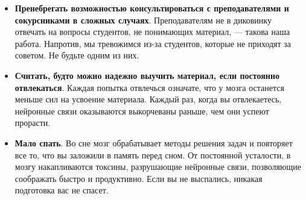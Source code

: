 \documentclass{article}
\begin{document}
\begin{itemize}
\item \textbf{Пренебрегать возможностью консультироваться с преподавателями и сокурсниками в сложных случаях}. Преподавателям не в диковинку отвечать на вопросы студентов, не понимающих материал, --- такова наша работа. Напротив, мы тревожимся из-за студентов, которые не приходят за советом. Не будьте одним из них.
\item \textbf{Считать, будто можно надежно выучить материал, если постоянно отвлекаться}. Каждая попытка отвлечься означате, что у мозга останется меньше сил на усвоение материала. Каждый раз, когда вы отвлекаетесь, нейронные связи оказываются выкорчеваны раньше, чем они успеют прорасти.
\item \textbf{Мало спать}. Во сне мозг обрабатывает методы решения задач и повторяет все то, что вы заложили в память перед сном. От постоянной усталости, в мозгу накапливаются токсины, разрушающие нейронные связи, позволяющие соображать быстро и продуктивно. Если вы не выспались, никакая подготовка вас не спасет.
\end{itemize}
\end{document}
